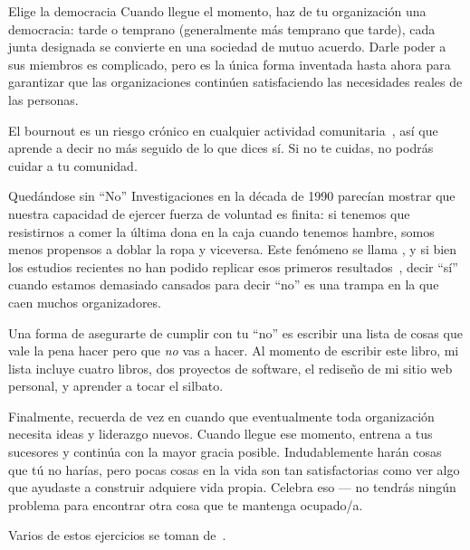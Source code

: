 \begin{aside}{Elige la democracia}
  Cuando llegue el momento, 
  haz de tu organización una democracia:
  tarde o temprano (generalmente más temprano que tarde), 
  cada junta designada se convierte en una sociedad de mutuo acuerdo.
  Darle poder a sus miembros es complicado, 
  pero es la única forma inventada hasta ahora para garantizar 
  que las organizaciones continúen satisfaciendo las necesidades reales de las personas.
\end{aside}


El bournout es un riesgo crónico en cualquier actividad comunitaria~\cite{Pign2016},
así que aprende a decir no más seguido de lo que dices sí.
Si no te cuidas,
no podrás cuidar a tu comunidad.

\begin{aside}{Quedándose sin ``No''}
  Investigaciones en la década de 1990 parecían mostrar que nuestra capacidad de ejercer fuerza de voluntad es finita:
  si tenemos que resistirnos a comer la última dona en la caja cuando tenemos hambre,
  somos menos propensos a doblar la ropa y viceversa.
  Este fenómeno se llama ,
  y si bien los estudios recientes no han podido replicar esos primeros resultados~\cite{Hagg2016},
  decir ``sí'' cuando estamos demasiado cansados ​​para decir ``no''
  es una trampa en la que caen muchos organizadores.
\end{aside}

Una forma de asegurarte de cumplir con tu ``no'' 
es escribir una lista de cosas que vale la pena hacer 
pero que \emph{no} vas a hacer.
Al momento de escribir este libro, mi lista incluye cuatro libros, 
dos proyectos de software,
el rediseño de mi sitio web personal,
y aprender a tocar el silbato.

Finalmente,
recuerda de vez en cuando que
eventualmente toda organización necesita ideas y liderazgo nuevos.
Cuando llegue ese momento,
entrena a tus sucesores y continúa con la mayor gracia posible.
Indudablemente harán cosas que tú no harías,
pero pocas cosas en la vida son tan satisfactorias como
ver algo que ayudaste a construir adquiere vida propia.
Celebra eso --- no tendrás ningún problema para encontrar otra cosa que te mantenga ocupado/a.


Varios de estos ejercicios se toman de~\cite{Brow2007}.

